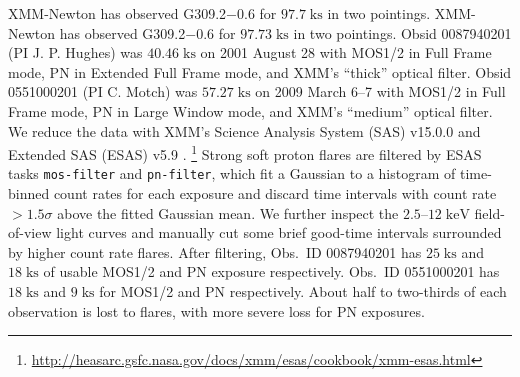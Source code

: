 \documentclass[twocolumn,tighten,trackchanges]{aastex61}
\newcommand*{\mt}{\mathrm}
\newcommand*{\unit}[1]{\;\mt{#1}}  %
\newcommand*{\Gsnr}{G309.2$-$0.6}
\begin{document}


%


XMM-Newton has observed \Gsnr{} for $97.7 \unit{ks}$ in two pointings.
XMM-Newton has observed \Gsnr{} for $97.73 \unit{ks}$ in two pointings.
Obsid 0087940201 (PI J. P. Hughes) was $40.46 \unit{ks}$ on 2001 August 28
with MOS1/2 in Full Frame mode, PN in Extended Full Frame mode, and XMM's
``thick'' optical filter.
Obsid 0551000201 (PI C. Motch) was $57.27 \unit{ks}$ on 2009 March 6--7
with MOS1/2 in Full Frame mode, PN in Large Window mode, and XMM's ``medium''
optical filter.
We reduce the data with XMM's Science Analysis System (SAS) v15.0.0 and
Extended SAS (ESAS) v5.9 \citep{snowden2008, kuntz2008}.
\footnote{\url{http://heasarc.gsfc.nasa.gov/docs/xmm/esas/cookbook/xmm-esas.html}}
Strong soft proton flares are filtered by ESAS tasks \texttt{mos-filter} and
\texttt{pn-filter}, which fit a Gaussian to a histogram of time-binned count
rates for each exposure and discard time intervals with count rate $>1.5\sigma$
above the fitted Gaussian mean.  %
We further inspect the $2.5$--$12 \unit{keV}$ field-of-view light curves and
manually cut some brief good-time intervals surrounded by higher count rate
flares.
After filtering, Obs.~ID 0087940201 has $25 \unit{ks}$ and $18 \unit{ks}$ of
usable MOS1/2 and PN exposure respectively.
Obs.~ID 0551000201 has $18 \unit{ks}$ and $9 \unit{ks}$ for MOS1/2 and PN
respectively.
About half to two-thirds of each observation is lost to flares, with more
severe loss for PN exposures.
\end{document}
